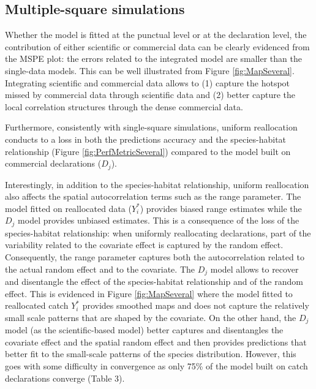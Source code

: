 \documentclass[
  english,
  man,floatsintext]{apa6}
\begin{document}
\hypertarget{multiple-square-simulations}{%
\subsection{Multiple-square simulations}\label{multiple-square-simulations}}

Whether the model is fitted at the punctual level or at the declaration level, the contribution of either scientific or commercial data can be clearly evidenced from the MSPE plot: the errors related to the integrated model are smaller than the single-data models. This can be well illustrated from Figure \ref{fig:MapSeveral}. Integrating scientific and commercial data allows to (1) capture the hotspot missed by commercial data through scientific data and (2) better capture the local correlation structures through the dense commercial data.

Furthermore, consistently with single-square simulations, uniform reallocation conducts to a loss in both the predictions accuracy and the species-habitat relationship (Figure \ref{fig:PerfMetricSeveral}) compared to the model built on commercial declarations (\(D_j\)).

Interestingly, in addition to the species-habitat relationship, uniform reallocation also affects the spatial autocorrelation terms such as the range parameter. The model fitted on reallocated data (\(Y_i^*\)) provides biased range estimates while the \(D_j\) model provides unbiased estimates. This is a consequence of the loss of the species-habitat relationship: when uniformly reallocating declarations, part of the variability related to the covariate effect is captured by the random effect. Consequently, the range parameter captures both the autocorrelation related to the actual random effect and to the covariate. The \(D_j\) model allows to recover and disentangle the effect of the species-habitat relationship and of the random effect. This is evidenced in Figure \ref{fig:MapSeveral} where the model fitted to reallocated catch \(Y_i^*\) provides smoothed maps and does not capture the relatively small scale patterns that are shaped by the covariate. On the other hand, the \(D_j\) model (as the scientific-based model) better captures and disentangles the covariate effect and the spatial random effect and then provides predictions that better fit to the small-scale patterns of the species distribution. However, this goes with some difficulty in convergence as only 75\% of the model built on catch declarations converge (Table 3).
\end{document}
